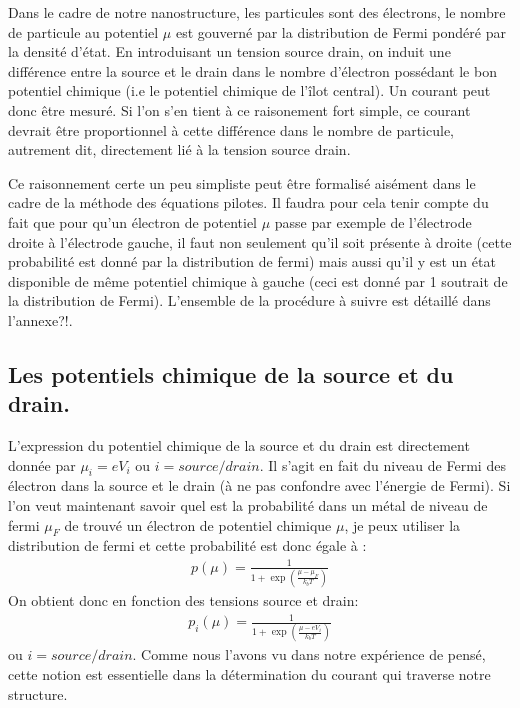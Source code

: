 Dans le cadre de notre nanostructure, les particules sont des électrons, le nombre de particule au potentiel $\mu$ est gouverné par la distribution de Fermi pondéré par la densité d'état. En introduisant un tension source drain, on induit une différence entre la source et le drain dans le nombre d'électron possédant le bon potentiel chimique (i.e le potentiel chimique de l'\^ilot central). Un courant peut donc \^etre mesuré. Si l'on s'en tient à ce raisonement fort simple, ce courant devrait \^etre proportionnel à cette différence dans le nombre de particule, autrement dit, directement lié à la tension source drain.

Ce raisonnement certe un peu simpliste peut \^etre formalisé aisément dans le cadre de la méthode des équations pilotes. Il faudra pour cela tenir compte du fait que pour qu'un électron de potentiel $\mu$ passe par exemple de l'électrode droite à l'électrode gauche, il faut non seulement qu'il soit présente à droite (cette probabilité est donné par la distribution de fermi) mais aussi qu'il y est un état disponible de m\^eme potentiel chimique à gauche (ceci est donné par 1 soutrait de la distribution de Fermi). L'ensemble de la procédure à suivre est détaillé dans l'annexe?!.

\subsection{Les potentiels chimique de la source et du drain.}
L'expression du potentiel chimique de la source et du drain est directement donnée par $\mu_i = e V_i$ ou $i=source/drain$. Il s'agit en fait du niveau de Fermi des électron dans la source et le drain (à ne pas confondre avec l'énergie de Fermi). Si l'on veut maintenant savoir quel est la probabilité dans un métal de niveau de fermi $\mu_F$ de trouvé un électron de potentiel chimique $\mu$, je peux utiliser la distribution de fermi et cette probabilité est donc égale à :
\begin{eqnarray}
p(\mu) = \frac{1}{1 + \exp{(\frac{\mu - \mu_F}{k_bT})}} \nonumber
\end{eqnarray}
 On obtient donc en fonction des tensions source et drain:
\begin{eqnarray}
p_i(\mu) = \frac{1}{1 + \exp{(\frac{\mu - eV_i}{k_bT})}}
\end{eqnarray}
ou $i=source/drain$. Comme nous l'avons vu dans notre expérience de pensé, cette notion est essentielle dans la détermination du courant qui traverse notre structure.

